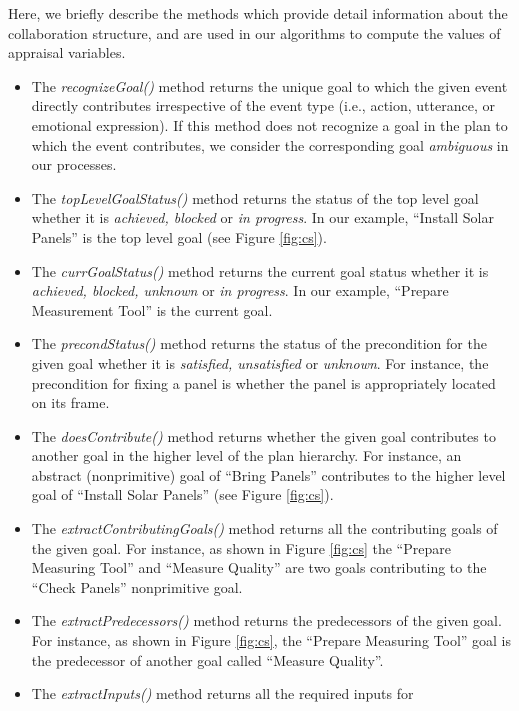 \documentclass[letterpaper]{article}
\begin{document}
Here, we briefly describe the methods which provide detail information about the
collaboration structure, and are used in our algorithms to compute the values of
appraisal variables.

\begin{itemize}
  \item The \textit{recognizeGoal()} method returns the unique goal to which
  the given event directly contributes irrespective of the event type (i.e.,
  action, utterance, or emotional expression). If this method does not recognize
  a goal in the plan to which the event contributes, we consider the
  corresponding goal \textit{ambiguous} in our processes.
  \item The \textit{topLevelGoalStatus()} method returns the status of the top
  level goal whether it is \textit{achieved, blocked} or \textit{in progress}.
  In our example, ``Install Solar Panels'' is the top level goal (see Figure
  \ref{fig:cs}).
  \item The \textit{currGoalStatus()} method returns the current goal status
  whether it is \textit{achieved, blocked, unknown} or \textit{in progress}. In
  our example, ``Prepare Measurement Tool'' is the current goal.
  \item The \textit{precondStatus()} method returns the status of the
  precondition for the given goal whether it is \textit{satisfied, unsatisfied}
  or \textit{unknown}. For instance, the precondition for fixing a panel is
  whether the panel is appropriately located on its frame.
  \item The \textit{doesContribute()} method returns whether the given goal
  contributes to another goal in the higher level of the plan hierarchy. For
  instance, an abstract (nonprimitive) goal of ``Bring Panels'' contributes to
  the higher level goal of ``Install Solar Panels'' (see Figure \ref{fig:cs}).
  \item The \textit{extractContributingGoals()} method returns all the
  contributing goals of the given goal. For instance, as shown in Figure
  \ref{fig:cs} the ``Prepare Measuring Tool'' and ``Measure Quality'' are two
  goals contributing to the ``Check Panels'' nonprimitive goal.
  \item The \textit{extractPredecessors()} method returns the predecessors of
  the given goal. For instance, as shown in Figure \ref{fig:cs}, the ``Prepare
  Measuring Tool'' goal is the predecessor of another goal called ``Measure
  Quality''.
  \item The \textit{extractInputs()} method returns all the required inputs for

\end{itemize}
\end{document}
